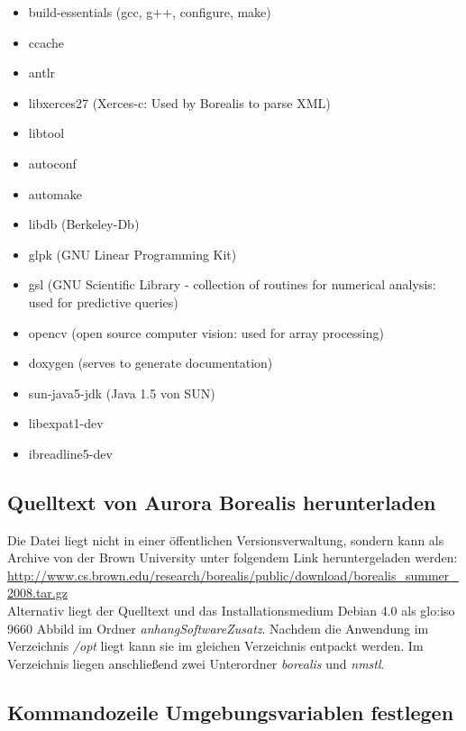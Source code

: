 \begin{itemize}
	\item build-essentials (gcc, g++, configure, make)
	\item ccache
	\item antlr
	\item libxerces27 (Xerces-c: Used by Borealis to parse XML)
	\item libtool
	\item autoconf
	\item automake
	\item libdb (Berkeley-Db)
	\item glpk (GNU Linear Programming Kit)
	\item gsl (GNU Scientific Library - collection of routines for numerical analysis: used for predictive queries)
	\item opencv (open source computer vision: used for array processing)
	\item doxygen (serves to generate documentation)
	\item sun-java5-jdk (Java 1.5 von SUN)
	\item libexpat1-dev
	\item ibreadline5-dev
\end{itemize}


\subsection{Quelltext von Aurora Borealis herunterladen}

Die Datei liegt nicht in einer öffentlichen Versionsverwaltung, sondern kann als Archive von der Brown University unter folgendem Link heruntergeladen werden:
\url{http://www.cs.brown.edu/research/borealis/public/download/borealis_summer_2008.tar.gz} \\
Alternativ liegt der Quelltext und das Installationsmedium Debian 4.0 als \gls{glo:iso} 9660 Abbild im Ordner \textit{anhangSoftwareZusatz}. Nachdem die Anwendung im Verzeichnis \textit{/opt} liegt kann sie im gleichen Verzeichnis entpackt werden. Im Verzeichnis liegen anschließend zwei Unterordner \textit{borealis} und \textit{nmstl}.


\subsection{Kommandozeile Umgebungsvariablen festlegen}

